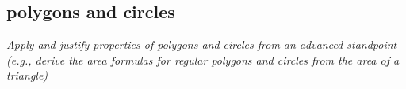 \subsection{polygons and circles}

\textit{Apply and justify properties of polygons and circles from an advanced standpoint (e.g.,
derive the area formulas for regular polygons and circles from the area of a triangle)}
